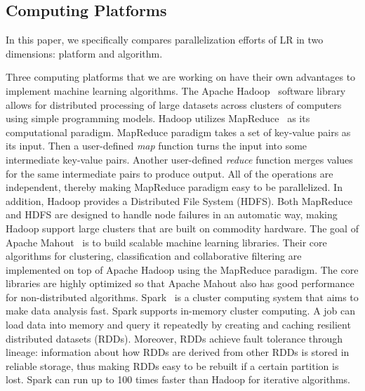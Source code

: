 \documentclass[10pt, conference, compsocconf]{IEEEtran}
\begin{document}
\subsection{Computing Platforms}\label{sec:platform}
In this paper, we specifically compares parallelization efforts of LR in two dimensions: platform and algorithm.

Three computing platforms that we are working on have their own advantages to implement machine learning algorithms.
The Apache Hadoop~\cite{white2012hadoop} software library allows for distributed processing of large datasets across clusters of computers using simple programming models.
Hadoop utilizes MapReduce~\cite{dean2008mapreduce} as its computational paradigm.
MapReduce paradigm takes a set of key-value pairs as its input.
Then a user-defined \textit{map} function turns the input into some intermediate key-value pairs.
Another user-defined \textit{reduce} function merges values for the same intermediate pairs to produce output.
All of the operations are independent, thereby making MapReduce paradigm easy to be parallelized.
In addition, Hadoop provides a Distributed File System (HDFS).
Both MapReduce and HDFS are designed to handle node failures in an automatic way, making Hadoop support large clusters that are built on commodity hardware.
The goal of Apache Mahout~\cite{mahoutscalable} is to build scalable machine learning libraries. Their core algorithms for clustering, classification and collaborative filtering are implemented on top of Apache Hadoop using the MapReduce paradigm. The core libraries are highly optimized so that Apache Mahout also has good performance for non-distributed algorithms.
Spark~\cite{zaharia2010spark} is a cluster computing system that aims to make data analysis fast.
Spark supports in-memory cluster computing. A job can load data into memory and query it repeatedly by creating and caching resilient distributed datasets (RDDs).
Moreover, RDDs achieve fault tolerance through lineage: information about how RDDs are derived from other RDDs is stored in reliable storage, thus making RDDs easy to be rebuilt if a certain partition is lost.
Spark can run up to 100 times faster than Hadoop for iterative algorithms.
\end{document}
